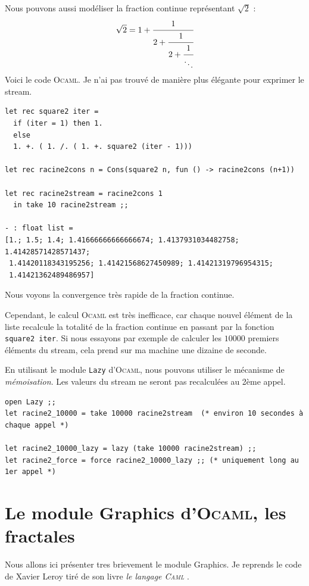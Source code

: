 Nous pouvons aussi modéliser la fraction continue représentant $\sqrt{2}$ :
\begin{equation*}
\sqrt{2} = 1 + \cfrac{1}{2
+ \cfrac{1}{2
+ \cfrac{1}{\ddots
 } } }
\end{equation*}
Voici le code \textsc{Ocaml}. Je n'ai pas trouvé de manière plus élégante pour exprimer le stream.
\begin{Verbatim}
let rec square2 iter =
  if (iter = 1) then 1.
  else
  1. +. ( 1. /. ( 1. +. square2 (iter - 1)))

let rec racine2cons n = Cons(square2 n, fun () -> racine2cons (n+1))

let rec racine2stream = racine2cons 1
  in take 10 racine2stream ;;

- : float list =
[1.; 1.5; 1.4; 1.41666666666666674; 1.4137931034482758; 1.41428571428571437;
 1.41420118343195256; 1.41421568627450989; 1.41421319796954315;
 1.41421362489486957]
\end{Verbatim}
Nous voyons la convergence très rapide de la fraction continue.

Cependant, le calcul \textsc{Ocaml} est très inefficace, car chaque nouvel élément de la liste recalcule la totalité de la fraction continue
en passant par la fonction \verb+square2 iter+. Si nous essayons par exemple de calculer les $10000$ premiers éléments du stream, cela prend sur ma machine une
dizaine de seconde. 

En utilisant le module \verb+Lazy+ d'\textsc{Ocaml}, nous pouvons utiliser le mécanisme
 de \textit{mémoisation}. Les valeurs du stream ne seront pas recalculées au 
2ème appel.
\begin{Verbatim}
open Lazy ;;
let racine2_10000 = take 10000 racine2stream  (* environ 10 secondes à chaque appel *)

let racine2_10000_lazy = lazy (take 10000 racine2stream) ;;
let racine2_force = force racine2_10000_lazy ;; (* uniquement long au 1er appel *)
\end{Verbatim} 



\section{Le module Graphics d'\textsc{Ocaml}, les fractales}

Nous allons ici présenter tres brievement le module Graphics.
Je reprends le code de Xavier Leroy tiré de son livre \textit{le langage \textsc{Caml}} \cite{caml}.

